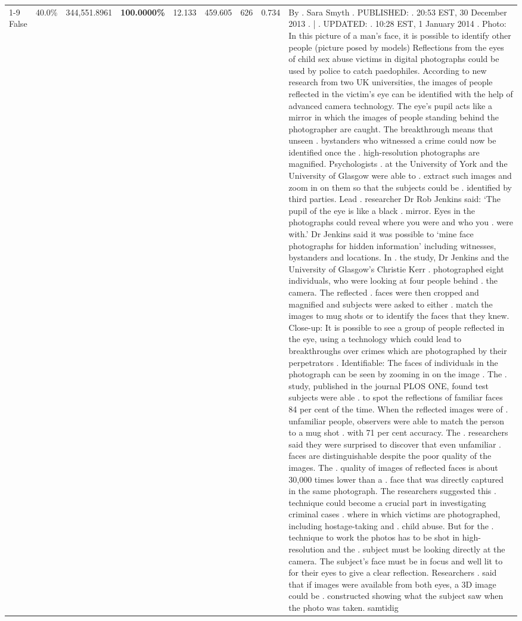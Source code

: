 \begin{table}[H]
\begin{tabular}{lllrlllll}
\cline{1-9}
False & 40.0\% & 344,551.8961 & \bfseries \color{red} 100.0000\% & 12.133 & 459.605 & 626 & 0.734 & By . Sara Smyth . PUBLISHED: . 20:53 EST, 30 December 2013 . | . UPDATED: . 10:28 EST, 1 January 2014 . Photo: In this picture of a man's face, it is possible to identify other people (picture posed by models) Reflections from the eyes of child sex abuse victims in digital photographs could be used by police to catch paedophiles. According to new research from two UK universities, the images of people reflected in the victim's eye can be identified with the help of advanced camera technology. The eye's pupil acts like a mirror in which the images of people standing behind the photographer are caught. The breakthrough means that unseen . bystanders who witnessed a crime could now be identified once the . high-resolution photographs are magnified. Psychologists . at the University of York and the University of Glasgow were able to . extract such images and zoom in on them so that the subjects could be . identified by third parties. Lead . researcher Dr Rob Jenkins said: ‘The pupil of the eye is like a black . mirror. Eyes in the photographs could reveal where you were and who you . were with.' Dr Jenkins said it was possible to ‘mine face photographs for hidden information' including witnesses, bystanders and locations. In . the study, Dr Jenkins and the University of Glasgow's Christie Kerr . photographed eight individuals, who were looking at four people behind . the camera. The reflected . faces were then cropped and magnified and subjects were asked to either . match the images to mug shots or to identify the faces that they knew. Close-up: It is possible to see a group of people reflected in the eye, using a technology which could lead to breakthroughs over crimes which are photographed by their perpetrators . Identifiable: The faces of individuals in the photograph can be seen by zooming in on the image . The . study, published in the journal PLOS ONE, found test subjects were able . to spot the reflections of familiar faces 84 per cent of the time. When the reflected images were of . unfamiliar people, observers were able to match the person to a mug shot . with 71 per cent accuracy. The . researchers said they were surprised to discover that even unfamiliar . faces are distinguishable despite the poor quality of the images. The . quality of images of reflected faces is about 30,000 times lower than a . face that was directly captured in the same photograph. The researchers suggested this . technique could become a crucial part in investigating criminal cases . where in which victims are photographed, including hostage-taking and . child abuse. But for the . technique to work the photos has to be shot in high-resolution and the . subject must be looking directly at the camera. The subject's face must be in focus and well lit to for their eyes to give a clear reflection. Researchers . said that if images were available from both eyes, a 3D image could be . constructed showing what the subject saw when the photo was taken. samtidig \\

\end{tabular}
\end{table}
